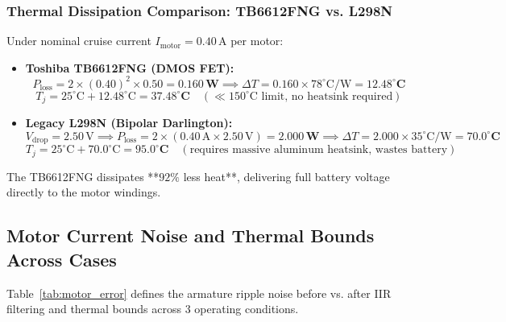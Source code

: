 \documentclass[11pt, a4paper]{article}
\begin{document}
\subsubsection{Thermal Dissipation Comparison: TB6612FNG vs. L298N}
Under nominal cruise current $I_{\text{motor}} = 0.40\,\text{A}$ per motor:
\begin{itemize}
    \item \textbf{Toshiba TB6612FNG (DMOS FET):}
    \begin{equation}
        P_{\text{loss}} = 2 \times (0.40)^2 \times 0.50 = \mathbf{0.160\,\text{W}} \implies \Delta T = 0.160 \times 78^\circ\text{C/W} = \mathbf{12.48^\circ\text{C}}
    \end{equation}
    \begin{equation}
        T_j = 25^\circ\text{C} + 12.48^\circ\text{C} = \mathbf{37.48^\circ\text{C}} \quad (\ll 150^\circ\text{C} \text{ limit, no heatsink required})
    \end{equation}
    \item \textbf{Legacy L298N (Bipolar Darlington):}
    \begin{equation}
        V_{\text{drop}} = 2.50\,\text{V} \implies P_{\text{loss}} = 2 \times (0.40\,\text{A} \times 2.50\,\text{V}) = \mathbf{2.000\,\text{W}} \implies \Delta T = 2.000 \times 35^\circ\text{C/W} = \mathbf{70.0^\circ\text{C}}
    \end{equation}
    \begin{equation}
        T_j = 25^\circ\text{C} + 70.0^\circ\text{C} = \mathbf{95.0^\circ\text{C}} \quad (\text{requires massive aluminum heatsink, wastes battery})
    \end{equation}
\end{itemize}
The TB6612FNG dissipates **$92\%$ less heat**, delivering full battery voltage directly to the motor windings.

\subsection{Motor Current Noise and Thermal Bounds Across Cases}
Table~\ref{tab:motor_error} defines the armature ripple noise before vs. after IIR filtering and thermal bounds across 3 operating conditions.
\end{document}
